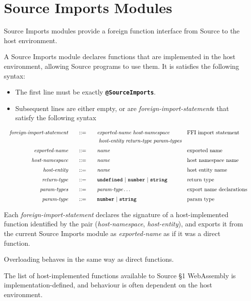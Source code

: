\section{Source Imports Modules}

Source Imports modules provide a foreign function interface from Source to the host environment.

A Source Imports module declares functions that are implemented in the host environment, allowing Source programs to use them.  It is satisfies the following syntax:

\begin{itemize}

\item The first line must be exactly \texttt{\textbf{@SourceImports}}.
\item Subsequent lines are either empty, or are \emph{foreign-import-statement}s that satisfy the following syntax

\end{itemize}

\begin{alignat*}{9}
&& \textit{foreign-import-statement}    &&\quad ::= &\quad && \textit{exported-name} \ \textit{host-namespace} && \textrm{FFI import statement} \\ 
&&  && &\quad && \ \textit{host-entity} \ \textit{return-type} \ \textit{param-types} && \\[1mm]
&& \textit{exported-name}    &&\quad ::= &\quad && \textit{name}
                                                           && \textrm{exported name} \\[1mm]
&& \textit{host-namespace}  && ::= &\quad && \textit{name}
                                                           && \textrm{host namespace name} \\[1mm]
&& \textit{host-entity}  && ::= &\quad && \textit{name}
                                                           && \textrm{host entity name} \\[1mm]
&& \textit{return-type}  && ::= &\quad && \textbf{\texttt{undefined}}\ | \ \textbf{\texttt{number}}\ | \ \textbf{\texttt{string}}
                                                            && \textrm{return type} \\[1mm]
&& \textit{param-types}  && ::= &\quad && \textit{param-type} \ldots
                                                            && \textrm{export name declarations} \\[1mm]
&& \textit{param-type}  && ::= &\quad && \textbf{\texttt{number}}\ | \ \textbf{\texttt{string}}
                                                            && \textrm{param type}
\end{alignat*}

Each \textit{foreign-import-statement} declares the signature of a host-implemented function identified by the pair (\textit{host-namespace}, \textit{host-entity}), and exports it from the current Source Imports module as \textit{exported-name} as if it was a direct function.

Overloading behaves in the same way as direct functions.

The list of host-implemented functions available to Source \S 1 WebAssembly is implementation-defined, and behaviour is often dependent on the host environment.
